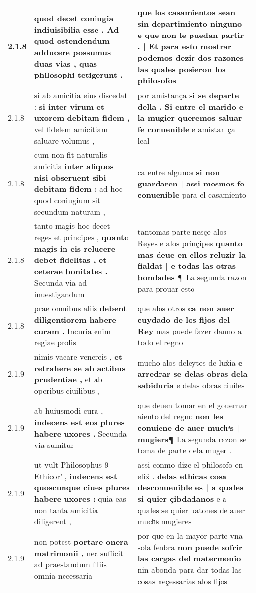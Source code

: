 \begin{tabular}{|p{1cm}|p{6.5cm}|p{6.5cm}|}
2.1.8 & quod decet coniugia indiuisibilia esse . \textbf{ Ad quod ostendendum adducere possumus duas vias , } quas philosophi tetigerunt . & que los casamientos sean sin departimiento ninguno \textbf{ e que non le puedan partir . | Et para esto mostrar podemos dezir dos razones } las quales posieron los philosofos \\\hline
2.1.8 & si ab amicitia eius discedat : \textbf{ si inter virum et uxorem debitam fidem , } vel fidelem amicitiam saluare volumus , & por amistança \textbf{ si se departe della . Si entre el marido e la mugier queremos saluar fe conuenible } e amistan ça leal \\\hline
2.1.8 & cum non fit naturalis amicitia \textbf{ inter aliquos nisi obseruent sibi debitam fidem ; } ad hoc quod coniugium sit secundum naturam , & ca entre algunos \textbf{ si non guardaren | assi mesmos fe conuenible } para el casamiento \\\hline
2.1.8 & tanto magis hoc decet reges et principes , \textbf{ quanto magis in eis relucere debet fidelitas , et ceterae bonitates . } Secunda via ad inuestigandum & tantomas parte nesçe alos Reyes e alos prinçipes \textbf{ quanto mas deue en ellos reluzir la fialdat | e todas las otras bondades ¶ } La segunda razon para prouar esto \\\hline
2.1.8 & prae omnibus aliis \textbf{ debent diligentiorem habere curam . } Incuria enim regiae prolis & que alos otros \textbf{ ca non auer cuydado de los fijos del Rey } mas puede fazer danno a todo el regno \\\hline
2.1.9 & nimis vacare venereis , \textbf{ et retrahere se ab actibus prudentiae , } et ab operibus ciuilibus , & mucho alos deleytes de lux̉ia \textbf{ e arredrar se delas obras dela sabiduria } e delas obras ciuiles \\\hline
2.1.9 & ab huiusmodi cura , \textbf{ indecens est eos plures habere uxores . } Secunda via sumitur & que deuen tomar en el gouernar aiento del regno \textbf{ non les conuiene de auer muchͣs | mugiers¶ } La segunda razon se toma de parte dela muger . \\\hline
2.1.9 & ut vult Philosophus 9 Ethicor’ , \textbf{ indecens est quoscunque ciues plures habere uxores : } quia eas non tanta amicitia diligerent , & assi conmo dize el philosofo en elix̊ . \textbf{ delas ethicas cosa desconuenible es | a quales si quier çibdadanos } e a quales se quier uatones de auer muchͣs mugieres \\\hline
2.1.9 & non potest \textbf{ portare onera matrimonii , } nec sufficit ad praestandum filiis omnia necessaria & por que en la mayor parte vna sola fenbra \textbf{ non puede sofrir las cargas del matermonio } nin abonda para dar todas las cosas neçessarias alos fijos \\\hline

\end{tabular}
